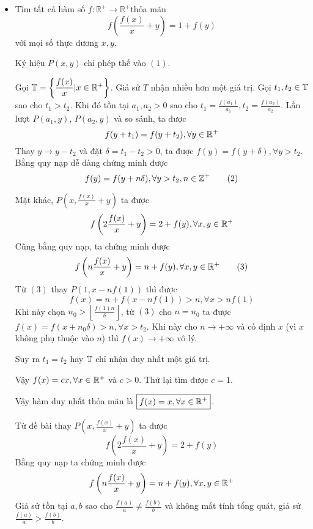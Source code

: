 \documentclass[11pt]{scrartcl}
\begin{document}
\begin{itemize}[label=, leftmargin=0em, itemsep=0.5em]
    \item \begin{bt}
        Tìm tất cả hàm số $f: \mathbb{R}^{+} \rightarrow \mathbb{R}^{+}$thỏa mãn
        \[
        f\left(\frac{f(x)}{x}+y\right)=1+f(y) \tag{1}
        \]
        với mọi số thực dương $x, y$.
    \end{bt}
    
    \begin{sol}
        Ký hiệu $P(x,y)$ chỉ phép thế vào $(1)$.


        Gọi $\bb{T} =\left\{\frac{f(x)}{x}| x \in \bb{R^+}\right\}$. Giả sử $T$ nhận nhiều hơn một giá trị. Gọi $t_1, t_2 \in \mathbb{T}$ sao cho $t_1 > t_2$. Khi đó tồn tại $a_1,a_2 > 0$ sao cho $t_1 = \frac{f(a_1)}{a_1}, t_2 = \frac{f(a_2)}{a_2}$. Lần lượt $P(a_1,y)$, $P(a_2,y)$ và so sánh, ta được 
        \[
            f(y + t_1) = f(y + t_2), \forall y\in \mathbb{R^+}
        \]
        Thay $y \to y - t_2$ và đặt $\delta = t_1 - t_2 > 0$, ta được $f(y) = f(y + \delta), \forall y > t_2$. Bằng quy nạp dễ dàng chứng minh được 
        \[f(y) = f(y + n\delta),\forall y > t_2, n \in \mathbb{Z^+} \tag{2}\]
        
        Mặt khác, $P(x, \frac{f(x)}{x} + y)$ ta được 
        \[
            f\left(2\frac{f(x)}{x}+y\right)=2+f(y), \xyro
        \]
        Cũng bằng quy nạp, ta chứng minh được 
        \[
            f\left(n\frac{f(x)}{x}+y\right)=n+f(y), \xyro \tag{3}
        \]
        Từ $(3)$ thay $P(1,x - nf(1))$ thì được 
        \[
            f(x) = n + f(x - nf(1)) > n ,\forall x > nf(1)
        \]
        Khi này chọn $n_0 > \left\lfloor \frac{f(1)n}{\delta}\right\rfloor$, từ $(3)$ cho $n = n_0$ ta được $f(x) = f(x + n_0\delta) > n, \forall x > t_2$. Khi này cho $n \to +\infty$ và cố định $x$ (vì $x$ không phụ thuộc vào $n$) thì $f(x) \to +\infty$ vô lý. 

        Suy ra $t_1 = t_2$ hay $\mathbb{T}$ chỉ nhận duy nhất một giá trị.

        Vậy $f(x) = cx, \forall x\in \mathbb{R^+}$ và $c > 0$. Thử lại tìm được $c = 1$. 

        Vậy hàm duy nhất thỏa mãn là $\boxed{f(x) = x, \forall x\in \mathbb{R^+}}$.

        Từ đề bài thay $P(x, \frac{f(x)}{x} + y)$ ta được 
        \[
            f\left(2\frac{f(x)}{x} + y\right) = 2 + f(y)
        \]
        Bằng quy nạp ta chứng minh được 
        \[
            f\left(n\frac{f(x)}{x} + y\right) = n + f(y),\xyro
        \]
        Giả sử tồn tại $a,b$ sao cho $\frac{f(a)}{a} \neq \frac{f(b)}{b}$ và không mất tính tổng quát, giả sử $\frac{f(a)}{a} > \frac{f(b)}{b}$. 
        

\end{sol}
\end{itemize}
\end{document}
